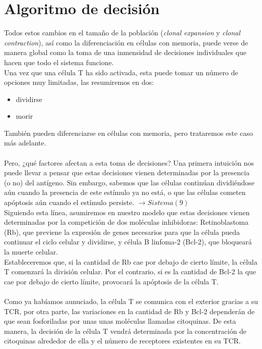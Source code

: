 \documentclass{article}
\begin{document}
	 \section{Algoritmo de decisión}
	 Todos estos cambios en el tamaño de la población (\textit{clonal expansion} y \textit{clonal contraction}), así como la diferenciación en células con memoria, puede verse de manera global como la toma de una inmensidad de decisiones individuales que hacen que todo el sistema funcione.
	 \\
	 Una vez que una célula T ha sido activada, esta puede tomar un número de opciones muy limitadas, las resumiremos en dos:
	 \begin{itemize}
	 	\item dividirse
	 	\item morir
	 \end{itemize}
     También pueden diferenciarse en células con memoria, pero trataremos este caso más adelante.
	 \\
	 \\
	 Pero, ¿qué factores afectan a esta toma de decisiones? Una primera intuición nos puede llevar a pensar que estas decisiones vienen determinadas por la presencia (o no) del antígeno. Sin embargo, sabemos que las células continúan dividiéndose aún cuando la presencia de este estímulo ya no está, o que las células cometen apóptosis aún cuando el estímulo persiste. $\rightarrow Sistema (9)$
	 \\
	 Siguiendo esta línea, asumiremos en nuestro modelo que estas decisiones vienen determinadas por la competición de dos moléculas inhibidoras: Retinoblastoma (Rb), que previene la expresión de genes necesarios para que la célula pueda continuar el ciclo celular y dividirse, y célula B linfoma-2 (Bcl-2), que bloqueará la muerte celular.
	 \\
	 Estableceremos que, si la cantidad de Rb cae por debajo de cierto límite, la célula T comenzará la división celular. Por el contrario, si es la cantidad de Bcl-2 la que  cae por debajo de cierto límite, provocará la apóptosis de la célula T. 
	 \\
	 \\
	 Como ya habíamos aunuciado, la célula T se comunica con el exterior gracias a su TCR, por otra parte, las variaciones en la cantidad de Rb y Bcl-2 dependerán de que sean fosforiladas por unas unas moléculas llamadas citoquinas. De esta manera, la decisión de la célula T vendrá determinada por la concentración de citoquinas alrededor de ella y el número de receptores existentes en su TCR.
\end{document}
